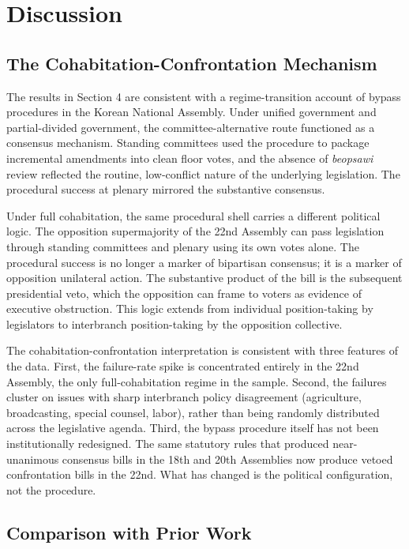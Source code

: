 \documentclass[11pt]{article}
\begin{document}
\section{Discussion}

\subsection{The Cohabitation-Confrontation Mechanism}

The results in Section 4 are consistent with a regime-transition account of bypass procedures in the Korean National Assembly. Under unified government and partial-divided government, the committee-alternative route functioned as a consensus mechanism. Standing committees used the procedure to package incremental amendments into clean floor votes, and the absence of \textit{beopsawi} review reflected the routine, low-conflict nature of the underlying legislation. The procedural success at plenary mirrored the substantive consensus.

Under full cohabitation, the same procedural shell carries a different political logic. The opposition supermajority of the 22nd Assembly can pass legislation through standing committees and plenary using its own votes alone. The procedural success is no longer a marker of bipartisan consensus; it is a marker of opposition unilateral action. The substantive product of the bill is the subsequent presidential veto, which the opposition can frame to voters as evidence of executive obstruction. This logic extends \citet{mayhew1974} from individual position-taking by legislators to interbranch position-taking by the opposition collective.

The cohabitation-confrontation interpretation is consistent with three features of the data. First, the failure-rate spike is concentrated entirely in the 22nd Assembly, the only full-cohabitation regime in the sample. Second, the failures cluster on issues with sharp interbranch policy disagreement (agriculture, broadcasting, special counsel, labor), rather than being randomly distributed across the legislative agenda. Third, the bypass procedure itself has not been institutionally redesigned. The same statutory rules that produced near-unanimous consensus bills in the 18th and 20th Assemblies now produce vetoed confrontation bills in the 22nd. What has changed is the political configuration, not the procedure.

\subsection{Comparison with Prior Work}
\end{document}

